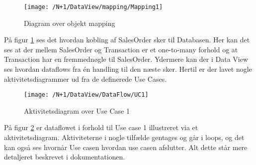 \begin{figure}[H]
	\centering
	\texttt{[image: /N+1/DataView/mapping/Mapping1]}
	\caption{Diagram over objekt mapping}
	\label{MapDia}
\end{figure}	

På figur \ref{MapDia} ses det hvordan kobling af SalesOrder sker til Databasen. Her kan det ses at der mellem SalesOrder og Transaction er et one-to-many forhold og at Transaction har en fremmednøgle til SalesOrder.\newline\newline
Ydermere kan der i Data View ses hvordan dataflows fra én handling til den næste sker. Hertil er der lavet nogle aktivitetsdiagrammer ud fra de definerede Use Cases. 


\begin{figure}[H]
	\centering
	\texttt{[image: /N+1/DataView/DataFlow/UC1]}
	\caption{Aktivitetsdiagram over Use Case 1}
	\label{AktDia}
\end{figure}

På figur \ref{AktDia} er dataflowet i forhold til Use case 1 illustreret via et aktivitetsdiagram. Aktiviteterne i nogle tilfælde gentages og går i loops, og det kan også ses hvornår Use casen hvordan use casen afslutter. Alt dette står mere detaljeret beskrevet i dokumentationen. 

 
 
  

